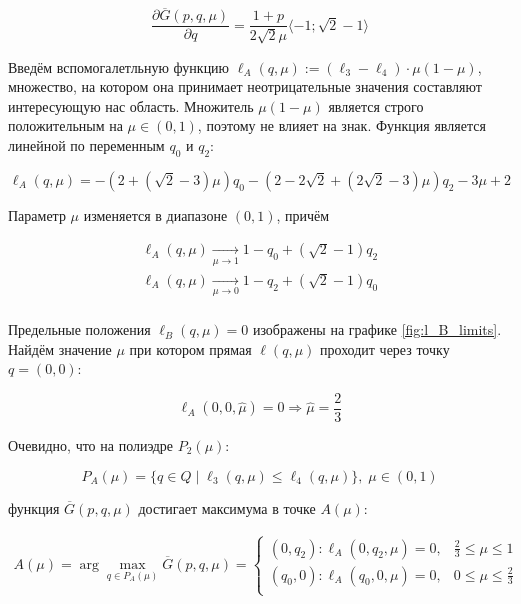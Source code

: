 \begin{flushleft}
	$$\frac{\partial \overline{G}(p,q,\mu)}{\partial q}=
	\frac{1+p}{2\sqrt{2}\mu} \langle -1;\sqrt{2}-1 \rangle 
 	$$
 	
	Введём вспомогалетльную функцию	
 	$\ell_A(q, \mu):=(\ell_3-\ell_4) \cdot \mu(1-\mu)$,
 	множество, на котором она принимает неотрицательные значения 
 	составляют интересующую нас область. Множитель $\mu(1-\mu)$ является строго
 	положительным на $\mu \in (0,1)$, поэтому не влияет на знак. Функция
 	является линейной по переменным $q_0$ и $q_2$:
 	
	$$\ell_A(q, \mu)=
	-(2+(\sqrt{2}-3)\mu)q_0
	-(2-2\sqrt{2}+(2\sqrt{2}-3)\mu)q_2
	-3\mu+2$$ 	
 	
	Параметр $\mu$ изменяется в диапазоне $(0,1)$, причём	
	
	\begin{gather*}	
	\ell_A(q,\mu) \xrightarrow[\mu\rightarrow 1]{} 
	1-q_0+(\sqrt{2}-1)q_2\\	
	\ell_A(q,\mu) \xrightarrow[\mu\rightarrow 0]{} 	
	1-q_2+(\sqrt{2}-1)q_0\\
	\end{gather*}
	
	Предельные положения $\ell_B(q, \mu)=0$ изображены на графике \eqref{fig:l_B_limits}.
	Найдём значение $\mu$ при котором прямая 
	$\ell(q, \mu)$ проходит через точку
	$q=(0,0)$:
	
	$$\ell_A(0,0,\hat \mu) = 0 \Rightarrow \hat \mu = \frac{2}{3}$$
	
	Очевидно, что на полиэдре $P_2(\mu):$
	
	$$P_A(\mu)=\{q \in Q \; | 
	\;  \ell_3(q, \mu) \leqslant \ell_4(q, \mu) \}, \; \mu \in (0,1)$$
	
	функция $\overline{G}(p,q,\mu)$ достигает максимума в точке $A(\mu):$
	
	\begin{gather*}
		A(\mu)= \arg \max \limits_{q\in P_A(\mu)} \overline G(p,q,\mu) =
		\begin{cases}
			(0, q_2) : \ell_A(0,q_2,\mu)=0, & \frac{2}{3} \leqslant \mu \leqslant 1 \\
			(q_0, 0) : \ell_A(q_0,0,\mu)=0, & 0 \leqslant \mu \leqslant \frac{2}{3} \\
		\end{cases}		
	\end{gather*}
	

\end{flushleft}
